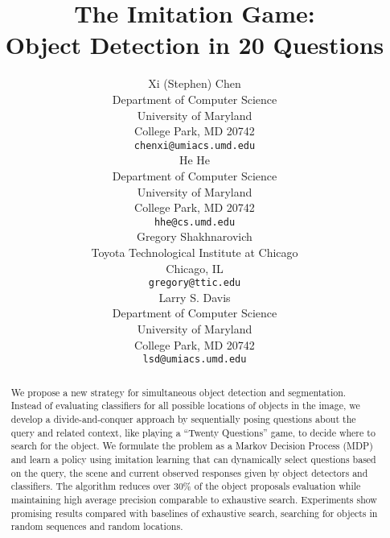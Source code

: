 \documentclass{article} %
\title{The Imitation Game:\\ Object Detection in 20 Questions}
\author{
Xi (Stephen) Chen\\
Department of Computer Science\\
University of Maryland\\
College Park, MD 20742 \\
\texttt{chenxi@umiacs.umd.edu} \\
\AND
He He \\
Department of Computer Science\\
University of Maryland\\
College Park, MD 20742 \\
\texttt{hhe@cs.umd.edu} \\
\And
Gregory Shakhnarovich\\
Toyota Technological Institute at Chicago \\
Chicago, IL\\
\texttt{gregory@ttic.edu} \\
\And
Larry S. Davis \\
Department of Computer Science\\
University of Maryland\\
College Park, MD 20742 \\
\texttt{lsd@umiacs.umd.edu} 
}
\begin{document}
\maketitle

\begin{abstract}
We propose a new strategy for simultaneous object detection and segmentation. Instead of evaluating classifiers for all possible locations of objects in the
image, we develop a divide-and-conquer approach by sequentially posing questions about the query and related context, like playing a ``Twenty Questions'' game, to decide where to search for the object. We formulate the problem as a Markov Decision Process (MDP) and learn a policy using imitation learning that can dynamically select questions based on the query, the scene and current observed responses given by object detectors and classifiers. The algorithm reduces over 30\% of the object proposals evaluation while maintaining high average precision comparable to exhaustive search. Experiments show promising results compared with baselines of exhaustive search, searching for objects in random sequences and random locations.
\end{abstract}


% 




% 






{\small


}
\end{document}
